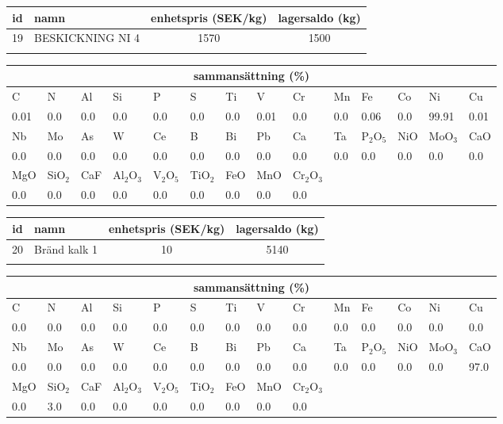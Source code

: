 \begin{center}
{\scriptsize\addtolength{\tabcolsep}{-3pt}
\begin{tabular}{clcc}
id&namn&enhetspris (SEK/kg)&lagersaldo (kg)\\
\hline
19&BESKICKNING NI 4&1570&1500\\\\
\end{tabular}
\begin{tabular}{llllllllllllll}
\multicolumn{14}{c}{sammansättning (\%)}\\
\hline
C&N&Al&Si&P&S&Ti&V&Cr&Mn&Fe&Co&Ni&Cu\\
\hline
0.01&0.0&0.0&0.0& 0.0&0.0&0.0&0.01& 0.0&0.0&0.06&0.0& 99.91&0.01\\
\hline
Nb&Mo&As&W&Ce&B&Bi&Pb&Ca&Ta&P$_2$O$_5$&NiO&MoO$_3$&CaO\\
\hline
0.0& 0.0& 0.0& 0.0& 0.0& 0.0& 0.0& 0.0& 0.0& 0.0& 0.0& 0.0& 0.0& 0.0\\
\hline
MgO&SiO$_2$&CaF&Al$_2$O$_3$&V$_2$O$_5$&TiO$_2$&FeO&MnO&Cr$_2$O$_3$\\
\hline
0.0& 0.0& 0.0& 0.0& 0.0& 0.0& 0.0& 0.0& 0.0\\
\end{tabular}
}
\end{center}

\begin{center}
{\scriptsize\addtolength{\tabcolsep}{-3pt}
\begin{tabular}{clcc}
id&namn&enhetspris (SEK/kg)&lagersaldo (kg)\\
\hline
20&Bränd kalk 1&10&5140\\\\
\end{tabular}
\begin{tabular}{llllllllllllll}
\multicolumn{14}{c}{sammansättning (\%)}\\
\hline
C&N&Al&Si&P&S&Ti&V&Cr&Mn&Fe&Co&Ni&Cu\\
\hline
0.0&0.0&0.0&0.0& 0.0&0.0&0.0&0.0& 0.0&0.0&0.0&0.0& 0.0&0.0\\
\hline
Nb&Mo&As&W&Ce&B&Bi&Pb&Ca&Ta&P$_2$O$_5$&NiO&MoO$_3$&CaO\\
\hline
0.0& 0.0& 0.0& 0.0& 0.0& 0.0& 0.0& 0.0& 0.0& 0.0& 0.0& 0.0& 0.0& 97.0\\
\hline
MgO&SiO$_2$&CaF&Al$_2$O$_3$&V$_2$O$_5$&TiO$_2$&FeO&MnO&Cr$_2$O$_3$\\
\hline
0.0& 3.0& 0.0& 0.0& 0.0& 0.0& 0.0& 0.0& 0.0\\
\end{tabular}
}
\end{center}


